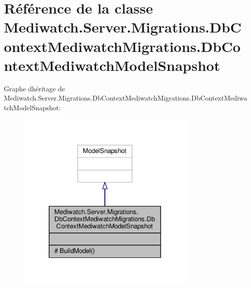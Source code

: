 \hypertarget{class_mediwatch_1_1_server_1_1_migrations_1_1_db_context_mediwatch_migrations_1_1_db_context_mediwatch_model_snapshot}{}\section{Référence de la classe Mediwatch.\+Server.\+Migrations.\+Db\+Context\+Mediwatch\+Migrations.\+Db\+Context\+Mediwatch\+Model\+Snapshot}
\label{class_mediwatch_1_1_server_1_1_migrations_1_1_db_context_mediwatch_migrations_1_1_db_context_mediwatch_model_snapshot}


Graphe d\textquotesingle{}héritage de Mediwatch.\+Server.\+Migrations.\+Db\+Context\+Mediwatch\+Migrations.\+Db\+Context\+Mediwatch\+Model\+Snapshot\+:
\nopagebreak
\begin{figure}[H]
\begin{center}
\leavevmode
\includegraphics[width=252pt]{class_mediwatch_1_1_server_1_1_migrations_1_1_db_context_mediwatch_migrations_1_1_db_context_mede4265d04ea6c9106ce2ecf4620b99a3e}
\end{center}
\end{figure}


